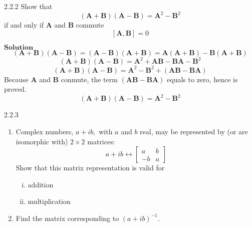 \documentclass{styles/kaobook}
\begin{document}
\begin{greenbox}{2.2.2}
Show that
$$
(\mathbf{A}+\mathbf{B})(\mathbf{A}-\mathbf{B})=\mathbf{A}^{2}-\mathbf{B}^{2}
$$
if and only if $\mathbf{A}$ and $\mathbf{B}$ commute
$$[\mathbf{A}, \mathbf{B}]=0$$
\end{greenbox}
$\boxed{\textbf{Solution}}$ 
$$(\mathbf{A}+\mathbf{B})(\mathbf{A}-\mathbf{B})=(\mathbf{A}-\mathbf{B})(\mathbf{A}+\mathbf{B})=\mathbf{A}(\mathbf{A}+\mathbf{B})-\mathbf{B}(\mathbf{A}+\mathbf{B})$$
$$(\mathbf{A}+\mathbf{B})(\mathbf{A}-\mathbf{B})=\mathbf{A}^2+\mathbf{A}\mathbf{B}-\mathbf{B}\mathbf{A}-\mathbf{B}^2$$
$$(\mathbf{A}+\mathbf{B})(\mathbf{A}-\mathbf{B})=\mathbf{A}^2-\mathbf{B}^2+(\mathbf{A}\mathbf{B}-\mathbf{B}\mathbf{A})$$
Because $\mathbf{A}$ and $\mathbf{B}$ conmute, the term $(\mathbf{A}\mathbf{B}-\mathbf{B}\mathbf{A})$ equals to zero, hence is proved.
$$(\mathbf{A}+\mathbf{B})(\mathbf{A}-\mathbf{B})=\mathbf{A}^2 -\mathbf{B}^2$$






\begin{greenbox}{2.2.3}
\begin{enumerate}[$(a)$]
\item Complex numbers, $a+i b,$ with $a$ and $b$ real, may be represented by (or are isomorphic with) $2 \times 2$ matrices:
$$
a+i b \longleftrightarrow\begin{bmatrix}{a} & {b} \\ {-b} & {a}\end{bmatrix}
$$
Show that this matrix representation is valid for 
\begin{enumerate}[(i)]
\item addition
\item multiplication
\end{enumerate}
\item Find the matrix corresponding to $(a+i b)^{-1}$.
\end{enumerate}
\end{greenbox}
\end{document}
